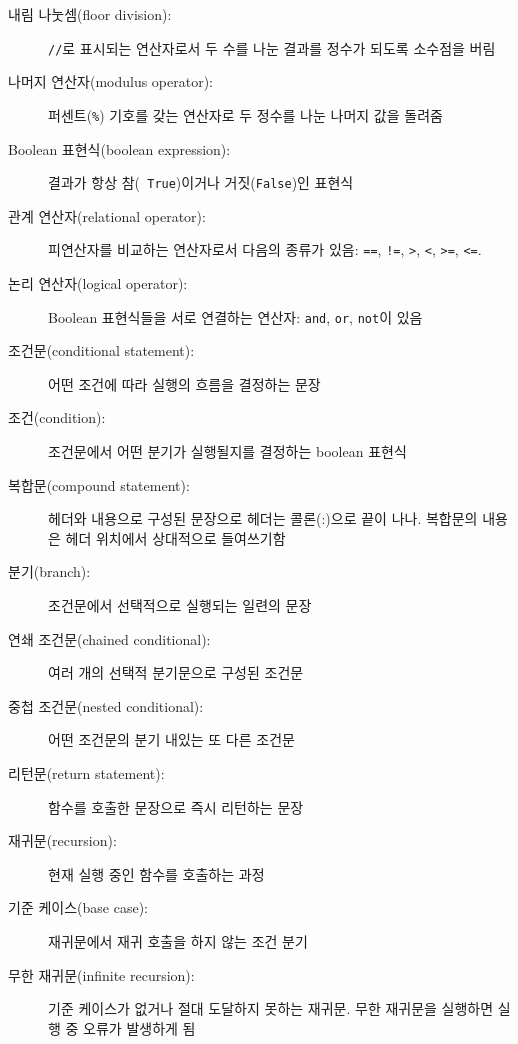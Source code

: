 \documentclass[10pt]{book}
\begin{document}
\begin{description}

\item[내림 나눗셈(floor division):] {\tt //}로 표시되는 연산자로서 두
  수를 나눈 결과를 정수가 되도록 소수점을 버림

\item[나머지 연산자(modulus operator):] 퍼센트({\tt \%}) 기호를 갖는
  연산자로 두 정수를 나눈 나머지 값을 돌려줌

\item[Boolean 표현식(boolean expression):] 결과가 항상 참({\tt
    True})이거나 거짓({\tt False})인 표현식 

\item[관계 연산자(relational operator):] 피연산자를 비교하는 연산자로서
  다음의 종류가 있음: {\tt ==}, {\tt !=}, {\tt >}, {\tt <}, {\tt >=},
  {\tt <=}.

\item[논리 연산자(logical operator):] Boolean 표현식들을 서로 연결하는
  연산자: {\tt and}, {\tt or}, {\tt not}이 있음

\item[조건문(conditional statement):] 어떤 조건에 따라 실행의 흐름을
  결정하는 문장

\item[조건(condition):]  조건문에서 어떤 분기가 실행될지를 결정하는 boolean 표현식

\item[복합문(compound statement):] 헤더와 내용으로 구성된 문장으로
  헤더는 콜론(:)으로 끝이 나나. 복합문의 내용은 헤더 위치에서
  상대적으로 들여쓰기함

\item[분기(branch):] 조건문에서 선택적으로 실행되는 일련의 문장

\item[연쇄 조건문(chained conditional):]  여러 개의 선택적 분기문으로 구성된 조건문

\item[중첩 조건문(nested conditional):]  어떤 조건문의 분기 내있는 또 다른 조건문

\item[리턴문(return statement):] 함수를 호출한 문장으로 즉시 리턴하는 문장

\item[재귀문(recursion):]  현재 실행 중인 함수를 호출하는 과정

\item[기준 케이스(base case):]  재귀문에서 재귀 호출을 하지 않는 조건 분기

\item[무한 재귀문(infinite recursion):] 기준 케이스가 없거나 절대
  도달하지 못하는 재귀문.  무한 재귀문을 실행하면 실행 중 오류가
  발생하게 됨

\end{description}
\end{document}
